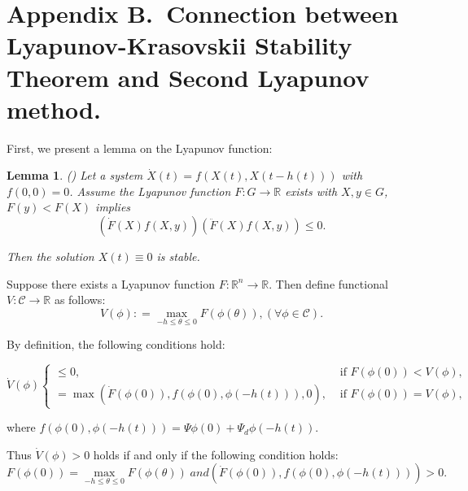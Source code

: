 \documentclass[journal]{IEEEtran}
\newtheorem{lemma}[theorem]{Lemma}
\begin{document}
\section*{Appendix B.~Connection between Lyapunov-Krasovskii Stability Theorem and Second Lyapunov method.}
\label{AppendixCCC}
First, we present a lemma on the Lyapunov function:
\begin{lemma}
  \label{lemmaYY}
  (\citep{Kolmanovskii1999}) Let a system $\dot{X}(t)=f(X(t), X(t-h\left(t\right)))$ with $f\left(0,0 \right)= 0$. Assume the Lyapunov function $F:G\rightarrow\mathbb{R}$ exists with $X,y\in G$, $F\left(y\right)<F\left(X\right)$ implies
  \begin{equation}
    \left(\dot{F}\left(X\right)f\left(X,y\right)\right)\left(\ddot{F}\left(X\right)f\left(X,y\right)\right)\le0.
  \end{equation}

  Then the solution $X(t)\equiv0$ is stable.
\end{lemma}

Suppose there exists a Lyapunov function $F:\mathbb{R}^n\rightarrow\mathbb{R}$. Then define functional $V:\mathcal{C}\rightarrow\mathbb{R}$ as follows:
\begin{equation}
  V(\phi ): = \mathop {\max }\limits_{ - h \le \theta  \le 0} F(\phi (\theta )),(\forall \phi  \in \mathcal{C}).
  \label{yy1}
\end{equation}

By definition, the following conditions hold:
\begin{small}
\begin{equation}
  \dot{V}(\phi)\left\{\begin{array}{cl}
    \leq 0,                                                          & \text { if } F(\phi(0))<V(\phi), \\
    =\max \left(\dot{F}(\phi(0)), f(\phi(0), \phi(-h(t))), 0\right), & \text { if } F(\phi(0))=V(\phi),
  \end{array}\right.
\end{equation}
\end{small}
where $f(\phi(0), \phi(-h(t)))=\Psi\phi(0)+\Psi_d\phi(-h(t))$.

Thus $\dot{V}\left(\phi\right)>0$ holds if and only if the following condition holds:
\begin{equation}
  F(\phi (0)) = \mathop {\max }\limits_{ - h \le \theta  \le 0} F(\phi (\theta ))\;and(\dot F(\phi (0)),f(\phi(0), \phi(-h(t)))) > 0.
  \label{yy3}
\end{equation}
\end{document}
